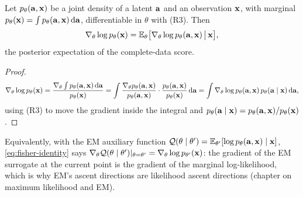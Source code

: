 \begin{proposition}
\label{prop:fisher-identity}
Let $p_\theta(\mathbf{a},\mathbf{x})$ be a joint density of a latent $\mathbf{a}$ and an observation $\mathbf{x}$,
with marginal $p_\theta(\mathbf{x})=\int p_\theta(\mathbf{a},\mathbf{x})\,\mathrm{d}\mathbf{a}$, differentiable in $\theta$ with
(R3). Then
\begin{equation}
  \nabla_\theta\log p_\theta(\mathbf{x})=\mathbb{E}_\theta\bigl[\nabla_\theta\log p_\theta(\mathbf{a},\mathbf{x})\,\big|\,\mathbf{x}\bigr],
  \label{eq:fisher-identity}
\end{equation}
the posterior expectation of the complete-data score.
\end{proposition}
\begin{proof}
\[
  \nabla_\theta\log p_\theta(\mathbf{x})=\frac{\nabla_\theta\int p_\theta(\mathbf{a},\mathbf{x})\,\mathrm{d}\mathbf{a}}{p_\theta(\mathbf{x})}
  =\int\frac{\nabla_\theta p_\theta(\mathbf{a},\mathbf{x})}{p_\theta(\mathbf{a},\mathbf{x})}\cdot\frac{p_\theta(\mathbf{a},\mathbf{x})}{p_\theta(\mathbf{x})}\,\mathrm{d}\mathbf{a}
  =\int\nabla_\theta\log p_\theta(\mathbf{a},\mathbf{x})\,p_\theta(\mathbf{a}\mid\mathbf{x})\,\mathrm{d}\mathbf{a} ,
\]
using (R3) to move the gradient inside the integral and $p_\theta(\mathbf{a}\mid\mathbf{x})=p_\theta(\mathbf{a},\mathbf{x})/p_\theta(\mathbf{x})$.
\end{proof}

Equivalently, with the EM auxiliary function $\mathcal{Q}(\theta\mid\theta')=\mathbb{E}_{\theta'}[\log p_\theta(\mathbf{a},\mathbf{x})\mid\mathbf{x}]$,
\cref{eq:fisher-identity} says $\nabla_\theta\mathcal{Q}(\theta\mid\theta')|_{\theta=\theta'}=\nabla_\theta\log p_{\theta'}(\mathbf{x})$:
the gradient of the EM surrogate at the current point is the gradient of the marginal
log-likelihood, which is why EM's ascent directions are likelihood ascent directions
(chapter on maximum likelihood and EM).

